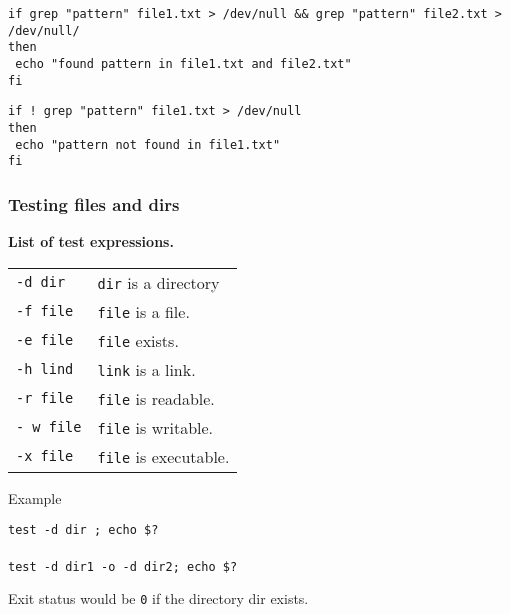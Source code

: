 \begin{mdframed}[nobreak=true]
\texttt{if grep "pattern" file1.txt > /dev/null \&\& grep "pattern" file2.txt > /dev/null/}\\
\texttt{then}\\
\texttt{    echo "found pattern in file1.txt and file2.txt"}\\
\texttt{fi}
\end{mdframed}

\begin{mdframed}
\texttt{if ! grep "pattern" file1.txt > /dev/null}\\
\texttt{then}\\
\texttt{    echo "pattern not found in file1.txt"}\\
\texttt{fi}
\end{mdframed}

\subsubsection{Testing files and dirs}
\textbf{List of test expressions.}\\

\begin{tabularx}{\linewidth}{lX}
\texttt{-d dir} & \texttt{dir} is a directory\\
\texttt{-f file} & \texttt{file} is a file.\\
\texttt{-e file} & \texttt{file} exists.\\
\texttt{-h lind} & \texttt{link} is a link.\\
\texttt{-r file} & \texttt{file} is readable.\\
\texttt{- w file} & \texttt{file} is writable.\\
\texttt{-x file} & \texttt{file} is executable.\\
\end{tabularx}

Example\\

\begin{mdframed}
\texttt{test -d dir ; echo \$? }\\
\null\\
\texttt{test -d dir1 -o -d dir2; echo \$?}

\end{mdframed}





Exit status would be \texttt{0} if the directory dir exists.\\


